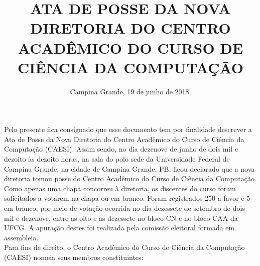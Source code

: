 \documentclass[10pt,letterpaper]{article}
\begin{document}
\title{ ATA DE POSSE DA NOVA DIRETORIA DO CENTRO ACADÊMICO DO CURSO DE CIÊNCIA DA COMPUTAÇÃO }
\date{Campina Grande, 19 de junho de 2018.}
\maketitle

Pelo presente fica consignado que esse documento tem por finalidade descrever a Ata de Posse da Nova Diretoria do Centro Acadêmico do Curso de Ciência da Computação (CAESI). Assim sendo, no dia dezenove de junho de dois mil e dezoito às dezoito horas, na sala do polo sede da Universidade Federal de Campina Grande, na cidade de Campina Grande, PB, ficou declarado que a nova diretoria tomou posse do Centro Acadêmico do Curso de Ciência da Computação. \\
Como apenas uma chapa concorreu à diretoria, os discentes do curso foram solicitados a votarem na chapa ou em branco. Foram registrados 250 a favor e 5 em branco, por meio de votação ocorrida no dia dezessete de setembro de dois mil e dezenove, entre as oito e as dezessete no bloco CN e no bloco CAA da UFCG. A apuração destes foi realizada pela comissão eleitoral formada em assembleia. \\
Para fins de direito, o Centro Acadêmico do Curso de Ciência da Computação (CAESI) nomeia seus membros constituintes:\\
\end{document}
